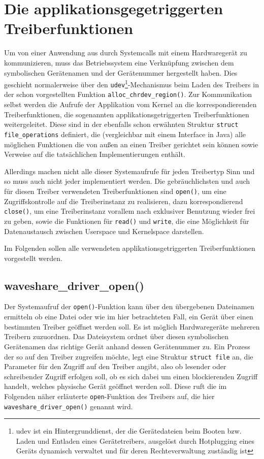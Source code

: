 \section{Die applikationsgegetriggerten Treiberfunktionen}
Um von einer Anwendung aus durch Systemcalls mit einem Hardwaregerät zu kommunizieren, muss das Betriebssystem eine Verknüpfung zwischen dem symbolischen Gerätenamen und der Gerätenummer hergestellt haben. Dies geschieht normalerweise über den \texttt{udev}\footnote{udev ist ein Hintergrunddienst, der die Gerätedateien beim Booten bzw. Laden und Entladen eines Gerätetreibers, ausgelöst durch Hotplugging eines Geräts dynamisch verwaltet und für deren Rechteverwaltung zuständig ist}-Mechanismus beim Laden des Treibers in der schon vorgestellten Funktion \texttt{alloc_chrdev_region()}. Zur Kommunikation selbst werden die Aufrufe der Applikation vom Kernel an die korrespondierenden Treiberfunktionen, die sogenannten applikationsgetriggerten Treiberfunktionen weitergeleitet. Diese sind in der ebenfalls schon erwähnten Struktur \texttt{struct file_operations} definiert, die (vergleichbar mit einem Interface in Java) alle möglichen Funktionen die von außen an einen Treiber gerichtet sein können sowie Verweise auf die tatsächlichen Implementierungen enthält. 

Allerdings machen nicht alle dieser Systemaufrufe für jeden Treibertyp Sinn und so muss auch nicht jeder implementiert werden. Die gebräuchlichsten und auch für diesen Treiber verwendeten Treiberfunktionen sind \texttt{open()}, um eine Zugriffskontrolle auf die Treiberinstanz zu realisieren, dazu korrespondierend \texttt{close()}, um eine Treiberinstanz vorallem nach exklusiver Benutzung wieder frei zu geben, sowie die Funktionen für \texttt{read()} und \texttt{write}, die eine Möglichkeit für Datenaustausch zwischen Userspace und Kernelspace darstellen. 

Im Folgenden sollen alle verwendeten applikationsgetriggerten Treiberfunktionen vorgestellt werden.


\subsection{waveshare\_driver\_open()}
Der Systemaufruf der \texttt{open()}-Funktion kann über den übergebenen Dateinamen ermitteln ob eine Datei oder wie im hier betrachteten Fall, ein Gerät über einen bestimmten Treiber geöffnet werden soll. Es ist möglich Hardwaregeräte mehreren Treibern zuzuordnen. Das Dateisystem ordnet über diesen symbolischen Gerätenamen das richtige Gerät anhand dessen Gerätenummer zu. %
Ein Prozess der so auf den Treiber zugreifen möchte, legt eine Struktur \texttt{struct file} an, die Parameter für den Zugriff auf den Treiber angibt, also ob lesender oder schreibender Zugriff erfolgen soll, ob es sich dabei um einen blockierenden Zugriff handelt, welches physische Gerät geöffnet werden soll. Diese ruft die im Folgenden näher erläuterte \texttt{open}-Funktion des Treibers auf, die hier \texttt{waveshare_driver_open()} genannt wird. \newline


